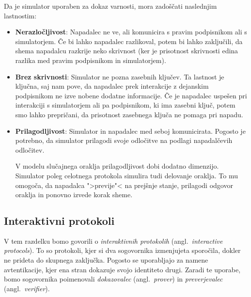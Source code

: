 \documentclass[isrm2, tisk]{fmfdelo}
\begin{document}
Da je simulator uporaben za dokaz varnosti, mora zadoščati naslednjim lastnostim:
\begin{itemize}
    \item \textbf{Nerazločljivost}: Napadalec ne ve, ali komunicira s pravim podpisnikom ali s
        simulatorjem. Če bi lahko napadalec razlikoval, potem bi lahko zaključili, da shema napadalcu
        razkrije neko skrivnost (ker je prisotnost skrivnosti edina razlika med pravim podpisnikom in
        simulatorjem).
    \item \textbf{Brez skrivnosti}: Simulator ne pozna zasebnih ključev. Ta lastnost je ključna, saj
        nam pove, da napadalec prek interakcije z dejanskim podpisnikom ne izve nobene dodatne informacije.
        Če je napadalec uspešen pri interakciji s simulatorjem ali pa podpisnikom, ki ima zasebni
        ključ, potem smo lahko prepričani, da prisotnost zasebnega ključa ne pomaga pri napadu.
    \item \textbf{Prilagodljivost}: Simulator in napadalec med seboj komunicirata. Pogosto je potrebno,
        da simulator prilagodi svoje odločitve na podlagi napadalčevih odločitev.

        V modelu slučajnega oraklja prilagodljivost dobi dodatno dimenzijo. Simulator poleg
        celotnega protokola simulira tudi delovanje oraklja. To mu omogoča, da napadalca ">previje"<
        na prejšnje stanje, prilagodi odgovor oraklja in ponovno izvede korak sheme.
\end{itemize}

\subsection{Interaktivni protokoli}
V tem razdelku bomo govorili o \textit{interaktivnih protokolih} (angl.\ \textit{interactive protocols}).
To so protokoli, kjer si dva sogovornika izmenjujeta sporočila, dokler ne prideta do skupnega zaključka.
Pogosto se uporabljajo za namene avtentikacije, kjer ena stran dokazuje svojo identiteto drugi.
Zaradi te uporabe, bomo sogovornika poimenovali \textit{dokazovalec} (angl.\ \textit{prover}) in
\textit{preverjevalec} (angl.\ \textit{verifier}).
\end{document}
